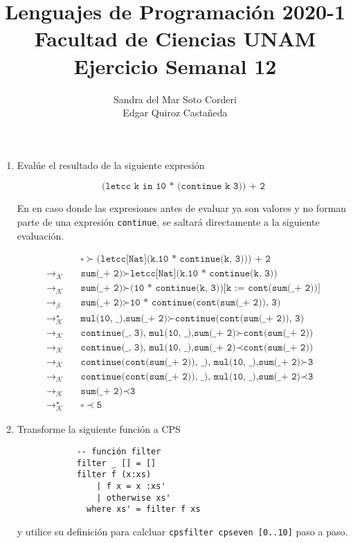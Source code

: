 \documentclass{article}
\title{
    Lenguajes de Programación 2020-1\\
    Facultad de Ciencias UNAM\\
    Ejercicio Semanal 12
}
\author{
    Sandra del Mar Soto Corderi\\
    Edgar Quiroz Castañeda
}
\newcommand{\tx}[1]{\texttt{#1}}
\newcommand{\es}{$\square$}
\newcommand{\pop}[2]{ \tx{#1} \succ \tx{#2}}
\newcommand{\push}[2]{ \tx{#1} \prec \tx{#2}}
\newcommand{\kr}{\rightarrow_{\mathcal{K}} \quad}
\newcommand{\br}{\rightarrow_{\beta} \quad}
\newcommand{\krs}{\rightarrow_{\mathcal{K}}^{\star} \quad}
\begin{document}
    
    \maketitle

    \begin{enumerate}
        \item Evalúe el resultado de la siguiente expresión

        \[
            \tx{(letcc k in 10 * (continue k 3)) + 2}
        \]

        En en caso donde las expresiones antes de evaluar ya son valores y no
        forman parte de una expresión \tx{continue}, se saltará directamente a
        la siguiente evaluación.

        \begin{align*}
            & \pop{\es}{(letcc[Nat](k.10 * continue(k, 3))) + 2} \\
            \kr & \pop{sum(\_ + 2)}{letcc[Nat](k.10 * continue(k, 3))} \\
            \kr & \pop{sum(\_ + 2)}{(10 * continue(k, 3))[k := cont(sum(\_ + 2))]} \\
            \br & \pop{sum(\_ + 2)}{10 * continue(cont(sum(\_ + 2)), 3)} \\
            \krs & \pop{mul(10, \_),sum(\_ + 2)}{continue(cont(sum(\_ + 2)), 3)} \\
            \kr & \pop{continue(\_, 3), mul(10, \_),sum(\_ + 2)}{cont(sum(\_ + 2))} \\
            \kr & \push{continue(\_, 3), mul(10, \_),sum(\_ + 2)}{cont(sum(\_ + 2))} \\
            \kr & \pop{continue(cont(sum(\_ + 2)), \_), mul(10, \_),sum(\_ + 2)}{3} \\
            \kr & \push{continue(cont(sum(\_ + 2)), \_), mul(10, \_),sum(\_ + 2)}{3} \\
            \kr & \push{sum(\_ + 2)}{3} \\
            \krs & \push{\es}{5}
        \end{align*}

        \item Transforme la siguiente función a CPS

        \begin{verbatim}
            -- función filter
            filter _ [] = []
            filter f (x:xs) 
                | f x = x :xs'
                | otherwise xs'
              where xs' = filter f xs
        \end{verbatim}

        y utilice su definición para calcluar \tx{cpsfilter cpseven [0..10]} 
        paso a paso.
        
    \end{enumerate}
\end{document}
